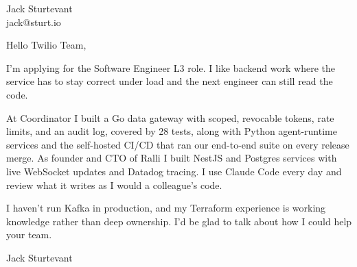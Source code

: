 \documentclass[11pt]{article}
\begin{document}
\raggedright

{\namefont\fontsize{20pt}{24pt}\selectfont Jack Sturtevant}\\[-0.3em]
jack@sturt.io

\vspace{1.2em}

Hello Twilio Team,

I'm applying for the Software Engineer L3 role. I like backend work where the service has to stay correct under load and the next engineer can still read the code.

At Coordinator I built a Go data gateway with scoped, revocable tokens, rate limits, and an audit log, covered by 28 tests, along with Python agent-runtime services and the self-hosted CI/CD that ran our end-to-end suite on every release merge. As founder and CTO of Ralli I built NestJS and Postgres services with live WebSocket updates and Datadog tracing. I use Claude Code every day and review what it writes as I would a colleague's code.

I haven't run Kafka in production, and my Terraform experience is working knowledge rather than deep ownership. I'd be glad to talk about how I could help your team.

\vspace{0.6em}
Jack Sturtevant
\end{document}
